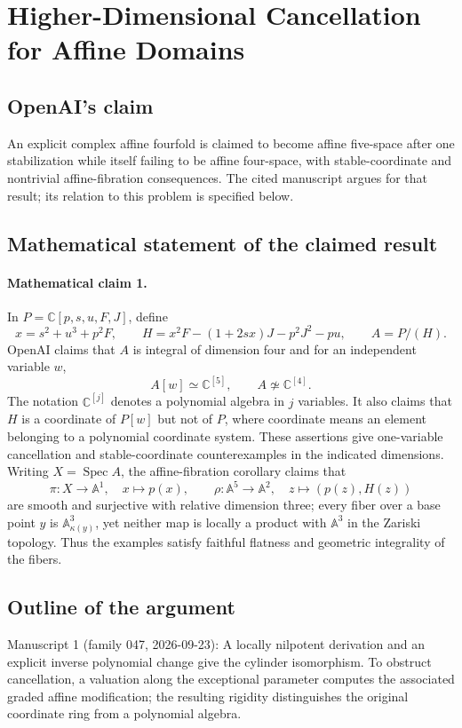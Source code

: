\documentclass[11pt]{article}
\begin{document}
\section*{Higher-Dimensional Cancellation for Affine Domains}

\subsection{OpenAI's claim}
An explicit complex affine fourfold is claimed to become affine five-space after one stabilization while itself failing to be affine four-space, with stable-coordinate and nontrivial affine-fibration consequences. The cited manuscript argues for that result; its relation to this problem is specified below.

\subsection{Mathematical statement of the claimed result}
\paragraph{Mathematical claim 1.} In $P=\mathbb C[p,s,u,F,J]$, define
\[
x=s^2+u^3+p^2F,\qquad H=x^2F-(1+2sx)J-p^2J^2-pu,\qquad A=P/(H).
\]
OpenAI claims that $A$ is integral of dimension four and for an independent variable $w$,
\[
A[w]\simeq\mathbb C^{[5]},\qquad A\not\simeq\mathbb C^{[4]}.
\]
The notation $\mathbb C^{[j]}$ denotes a polynomial algebra in $j$ variables. It also claims that $H$ is a coordinate of $P[w]$ but not of $P$, where coordinate means an element belonging to a polynomial coordinate system. These assertions give one-variable cancellation and stable-coordinate counterexamples in the indicated dimensions.
Writing $X=\operatorname{Spec}A$, the affine-fibration corollary claims that
\[
\pi:X\to\mathbb A^1,\quad x\mapsto p(x),\qquad
\rho:\mathbb A^5\to\mathbb A^2,\quad z\mapsto(p(z),H(z))
\]
are smooth and surjective with relative dimension three; every fiber over a base point $y$ is $\mathbb A^3_{\kappa(y)}$, yet neither map is locally a product with $\mathbb A^3$ in the Zariski topology. Thus the examples satisfy faithful flatness and geometric integrality of the fibers.

\subsection{Outline of the argument}
Manuscript 1 (family 047, 2026-09-23): A locally nilpotent derivation and an explicit inverse polynomial change give the cylinder isomorphism. To obstruct cancellation, a valuation along the exceptional parameter computes the associated graded affine modification; the resulting rigidity distinguishes the original coordinate ring from a polynomial algebra.
\end{document}
